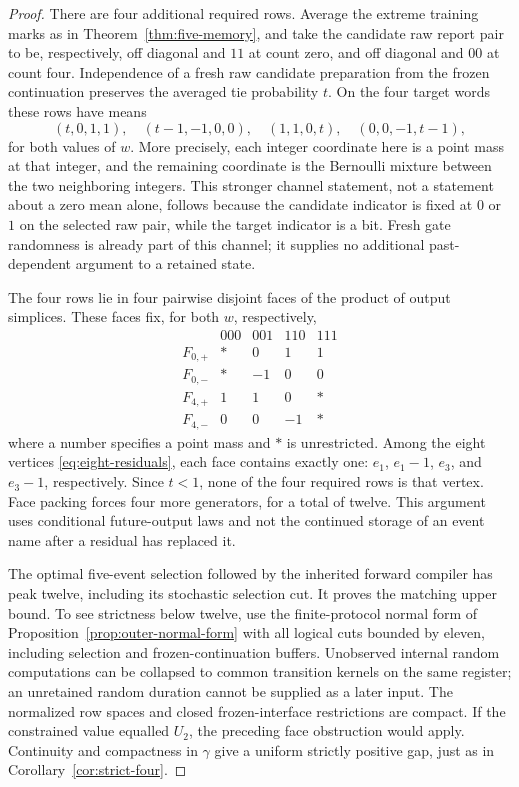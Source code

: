 \begin{proof}
There are four additional required rows. Average the extreme training
marks as in Theorem~\ref{thm:five-memory}, and take the candidate raw
report pair to be, respectively, off diagonal and $11$ at count zero,
and off diagonal and $00$ at count four. Independence of a fresh raw
candidate preparation from the frozen continuation preserves the
averaged tie probability $t$. On the four target words these rows have
means
\begin{equation}\label{eq:four-mixed-residuals}
 (t,0,1,1),\quad(t-1,-1,0,0),\quad
 (1,1,0,t),\quad(0,0,-1,t-1),
\end{equation}
for both values of $w$. More precisely, each integer coordinate here
is a point mass at that integer, and the remaining coordinate is the
Bernoulli mixture between the two neighboring integers. This stronger
channel statement, not a statement about a zero mean alone, follows
because the candidate indicator is fixed at $0$ or $1$ on the selected
raw pair, while the target indicator is a bit. Fresh gate randomness
is already part of this channel; it supplies no additional past-dependent
argument to a retained state.

The four rows lie in four pairwise disjoint faces of the product of
output simplices. These faces fix, for both $w$, respectively,
\[
\begin{array}{c|rrrr}
 &000&001&110&111\\\hline
 F_{0,+}&*&0&1&1\\
 F_{0,-}&*&-1&0&0\\
 F_{4,+}&1&1&0&*\\
 F_{4,-}&0&0&-1&*
\end{array}
\]
where a number specifies a point mass and $*$ is unrestricted.
Among the eight vertices \eqref{eq:eight-residuals}, each face contains
exactly one: $e_1$, $e_1-1$, $e_3$, and $e_3-1$, respectively.
Since $t<1$, none of the four required rows is that vertex. Face
packing forces four more generators, for a total of twelve.
This argument uses conditional future-output laws and not the continued
storage of an event name after a residual has replaced it.

The optimal five-event selection followed by the inherited forward
compiler has peak twelve, including its stochastic selection cut.
It proves the matching upper bound. To see strictness below twelve, use the finite-protocol normal form
of Proposition~\ref{prop:outer-normal-form} with all logical cuts
bounded by eleven, including selection and frozen-continuation buffers.
Unobserved internal random computations can be collapsed to common
transition kernels on the same register; an unretained random duration
cannot be supplied as a later input. The normalized row spaces and
closed frozen-interface restrictions are compact. If the constrained
value equalled $U_2$, the preceding face obstruction would apply.
Continuity and compactness in $\gamma$ give a uniform strictly positive
gap, just as in Corollary~\ref{cor:strict-four}.
\end{proof}

